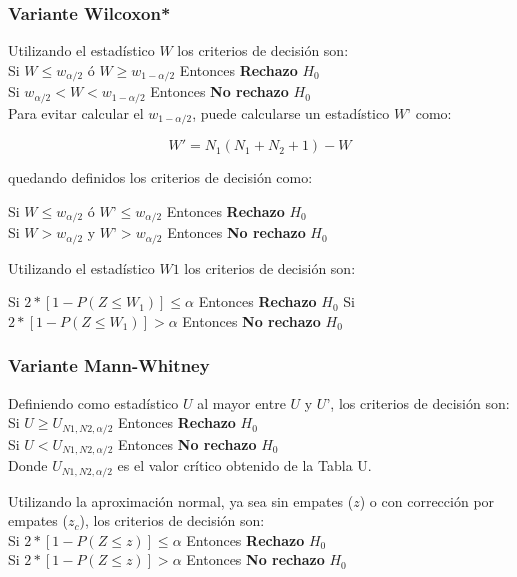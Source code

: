 \documentclass[]{book}
\theoremstyle{definition}
\theoremstyle{definition}
\theoremstyle{definition}
\theoremstyle{remark}
\begin{document}
\hypertarget{variante-wilcoxon}{%
\subsubsection{Variante Wilcoxon*}\label{variante-wilcoxon}}

Utilizando el estadístico \(W\) los criterios de decisión son:\\
Si \(W\le w_{\alpha/2}\) ó \(W\ge w_{1-\alpha/2}\) Entonces
\textbf{Rechazo} \(H_0\)\\
Si \(w_{\alpha/2}<W<w_{1-\alpha/2}\) Entonces \textbf{No rechazo}
\(H_0\)\\
Para evitar calcular el \(w_{1-\alpha/2}\), puede calcularse un
estadístico \(W’\) como:

\[W'=N_1 (N_1+N_2+1)-W\]

quedando definidos los criterios de decisión como:

Si \(W\le w_{\alpha/2}\) ó \(W’\le w_{\alpha/2}\) Entonces
\textbf{Rechazo} \(H_0\)\\
Si \(W>w_{\alpha/2}\) y \(W’>w_{\alpha/2}\) Entonces \textbf{No rechazo}
\(H_0\)

Utilizando el estadístico \(W1\) los criterios de decisión son:

Si \(2*[1-P(Z≤ W_1 )]\le \alpha\) Entonces \textbf{Rechazo} \(H_0\) Si
\(2*[1-P(Z≤ W_1 )]>\alpha\) Entonces \textbf{No rechazo} \(H_0\)

\hypertarget{variante-mann-whitney}{%
\subsubsection{Variante Mann-Whitney}\label{variante-mann-whitney}}

Definiendo como estadístico \(U\) al mayor entre \(U\) y \(U’\), los
criterios de decisión son:\\
Si \(U≥U_{N1,N2,\alpha/2}\) Entonces \textbf{Rechazo} \(H_0\)\\
Si \(U<U_{N1,N2,\alpha/2}\) Entonces \textbf{No rechazo} \(H_0\)\\
Donde \(U_{N1,N2,\alpha/2}\) es el valor crítico obtenido de la Tabla U.

Utilizando la aproximación normal, ya sea sin empates (\(z\)) o con
corrección por empates (\(z_c\)), los criterios de decisión son:\\
Si \(2*[1-P(Z≤ z )]≤\alpha\) Entonces \textbf{Rechazo} \(H_0\)\\
Si \(2*[1-P(Z≤ z )]>\alpha\) Entonces \textbf{No rechazo} \(H_0\)
\end{document}
